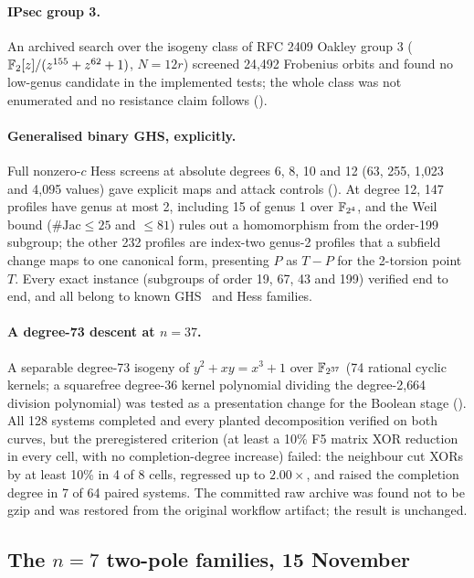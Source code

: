 \paragraph{IPsec group 3.} An archived search over the isogeny class of RFC
2409 Oakley group 3 ($\mathbb{F}_2[z]/(z^{155}+z^{62}+1)$, $N=12r$) screened 24{,}492
Frobenius orbits and found no low-genus candidate in the implemented tests;
the whole class was not enumerated and no resistance claim follows
().

\paragraph{Generalised binary GHS, explicitly.} Full nonzero-$c$ Hess screens
at absolute degrees 6, 8, 10 and 12 (63, 255, 1{,}023 and 4{,}095 values) gave
explicit maps and attack controls
(). At degree 12, 147
profiles have genus at most 2, including 15 of genus 1 over $\mathbb{F}_{2^4}$, and the
Weil bound ($\#\mathrm{Jac}\le25$ and $\le81$) rules out a homomorphism from
the order-199 subgroup; the other 232 profiles are index-two genus-2
profiles that a subfield change maps to one canonical form, presenting $P$ as
$T-P$ for the 2-torsion point $T$. Every exact instance (subgroups of order
19, 67, 43 and 199) verified end to end, and all belong to known
GHS~\cite{ghs2002} and Hess families.

\paragraph{A degree-73 descent at $n=37$.} A separable degree-73 isogeny of
$y^2+xy=x^3+1$ over $\mathbb{F}_{2^{37}}$ (74 rational cyclic kernels; a squarefree
degree-36 kernel polynomial dividing the degree-2{,}664 division polynomial)
was tested as a presentation change for the Boolean stage
(). All
128 systems completed and every planted decomposition verified on both
curves, but the preregistered criterion (at least a 10\% F5 matrix XOR
reduction in every cell, with no completion-degree increase) failed: the
neighbour cut XORs by at least 10\% in 4 of 8 cells, regressed up to
$2.00\times$, and raised the completion degree in 7 of 64 paired systems.
The committed raw archive was found not to be gzip and was restored from the
original workflow artifact; the result is unchanged.

\subsection{The $n=7$ two-pole families, 15 November}\label{sec:bt-ghs7}

